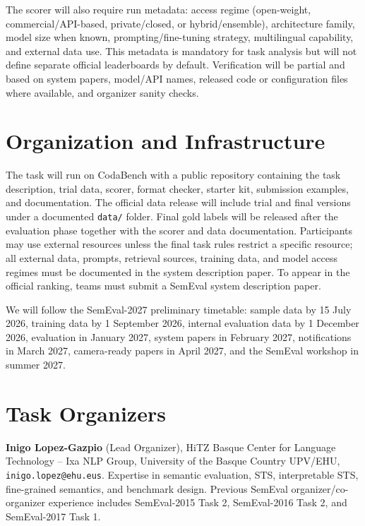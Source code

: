 \documentclass[11pt]{article}
\begin{document}
The scorer will also require run metadata:
access regime (open-weight, commercial/API-based, private/closed, or hybrid/ensemble), architecture family, model size when known, prompting/fine-tuning strategy, multilingual capability, and external data use.
This metadata is mandatory for task analysis but will not define separate official leaderboards by default.
Verification will be partial and based on system papers, model/API names, released code or configuration files where available, and organizer sanity checks.

\section{Organization and Infrastructure}

The task will run on CodaBench with a public repository containing the task description, trial data, scorer, format checker, starter kit, submission examples, and documentation.
The official data release will include trial and final versions under a documented \texttt{data/} folder.
Final gold labels will be released after the evaluation phase together with the scorer and data documentation.
Participants may use external resources unless the final task rules restrict a specific resource; all external data, prompts, retrieval sources, training data, and model access regimes must be documented in the system description paper.
To appear in the official ranking, teams must submit a SemEval system description paper.

We will follow the SemEval-2027 preliminary timetable:
sample data by 15 July 2026, training data by 1 September 2026, internal evaluation data by 1 December 2026, evaluation in January 2027, system papers in February 2027, notifications in March 2027, camera-ready papers in April 2027, and the SemEval workshop in summer 2027.

\section{Task Organizers}

\noindent\textbf{Inigo Lopez-Gazpio} (Lead Organizer), HiTZ Basque Center for Language Technology -- Ixa NLP Group, University of the Basque Country UPV/EHU, \texttt{inigo.lopez@ehu.eus}.
Expertise in semantic evaluation, STS, interpretable STS, fine-grained semantics, and benchmark design.
Previous SemEval organizer/co-organizer experience includes SemEval-2015 Task 2, SemEval-2016 Task 2, and SemEval-2017 Task 1.
\end{document}

